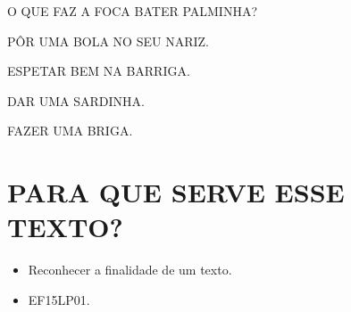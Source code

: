 O QUE FAZ A FOCA BATER PALMINHA?

\begin{escolha}
\item PÔR UMA BOLA NO SEU NARIZ.

\item ESPETAR BEM NA BARRIGA.

\item DAR UMA SARDINHA.

\item FAZER UMA BRIGA.
\end{escolha}

\chapter{PARA QUE SERVE ESSE TEXTO?}


\begin{itemize}
\item Reconhecer a finalidade de um texto.
\end{itemize}


\begin{itemize}
\item EF15LP01.
\end{itemize}

